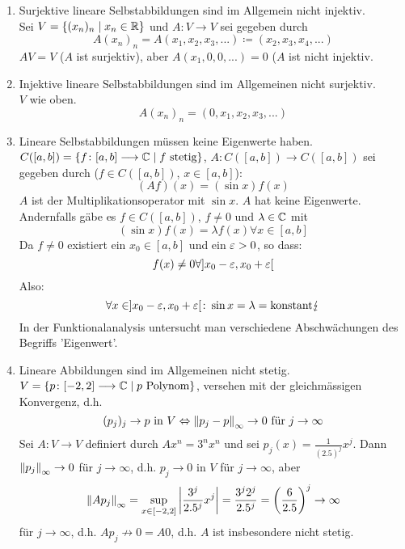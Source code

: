 \begin{enumerate}
\item Surjektive lineare Selbstabbildungen sind im Allgemein nicht injektiv.\\
Sei $ V=\lbrace(x_n)_n\mid x_n\in\mathbb{R}\rbrace $ und $ A\colon V\longrightarrow V $ sei gegeben durch
\[ A(x_n)_n=A(x_1,x_2,x_3,...)\coloneqq(x_2,x_3,x_4,...) \]
$ AV=V $ ($ A $ ist surjektiv), aber $ A(x_1,0,0,...)=0$ ($ A $ ist nicht injektiv.
\item Injektive lineare Selbstabbildungen sind im Allgemeinen nicht surjektiv.\\
$ V $ wie oben.
\[ A(x_n)_n=(0,x_1,x_2,x_3,...) \]
\item Lineare Selbstabbildungen m\"ussen keine Eigenwerte haben.\\
$ C([a,b])=\lbrace f\colon[a,b]\longrightarrow\mathbb{C}\mid f\text{ stetig}\rbrace $, $ A\colon C([a,b])\longrightarrow C([a,b]) $ sei gegeben durch ($ f\in C([a,b]) $, $ x\in[a,b] $):
\[ (Af)(x)=(\sin x)f(x) \]
$ A $ ist der Multiplikationsoperator mit $ \sin x $. $ A $ hat keine Eigenwerte. Andernfalls g\"abe es $ f\in C([a,b]) $, $ f\neq 0 $ und $ \lambda\in\mathbb{C} $ mit
\[ (\sin x)f(x)=\lambda f(x)\forall x\in[a,b] \]
Da $ f\neq 0 $ existiert ein $ x_0\in[a,b] $ und ein $ \varepsilon>0 $, so dass:
\[ f(x)\neq 0\forall ]x_0-\varepsilon,x_0+\varepsilon[ \]
Also:
\[ \forall x\in]x_0-\varepsilon,x_0+\varepsilon[\colon \sin x=\lambda=\text{konstant}\lightning \]
In der Funktionalanalysis untersucht man verschiedene Abschw\"achungen des Begriffs 'Eigenwert'.
\item Lineare Abbildungen sind im Allgemeinen nicht stetig.\\
$ V=\lbrace p\colon[-2,2]\longrightarrow\mathbb{C}\mid p\text{ Polynom}\rbrace $, versehen mit der gleichm\"assigen Konvergenz, d.h. \[(p_j)_j\to p  \text{ in }  V \Leftrightarrow \left\|p_j-p\right\|_\infty\to 0\text{ f\"ur }j\to\infty\]
Sei $ A\colon V\longrightarrow V $ definiert durch $ Ax^n=3^nx^n $ und sei $ p_j(x)=\frac{1}{(2.5)^j}x^j $. Dann $ \left\|p_j\right\|_\infty\to 0 $ f\"ur $ j\to\infty $, d.h. $ p_j\to 0 $ in $ V $ f\"ur $ j\to\infty $, aber
\[ \left\|Ap_j\right\|_\infty=\sup_{x\in[-2,2]}\left|\frac{3^j}{2.5^j}x^j\right|=\frac{3^j2^j}{2.5^j}=\left(\frac{6}{2.5}\right)^j\to\infty \] f\"ur $ j\to\infty $, d.h. $ Ap_j\not\rightarrow 0=A0 $, d.h. $ A $ ist insbesondere nicht stetig.
\end{enumerate}